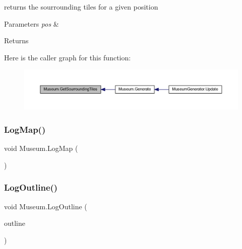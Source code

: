 returns the sourrounding tiles for a given position 


\begin{DoxyParams}{Parameters}
{\em pos} & \\
\hline
\end{DoxyParams}
\begin{DoxyReturn}{Returns}

\end{DoxyReturn}
Here is the caller graph for this function\+:
\nopagebreak
\begin{figure}[H]
\begin{center}
\leavevmode
\includegraphics[width=350pt]{class_museum_af5b732fe3a0821d02852171a73cf8f8b_icgraph}
\end{center}
\end{figure}
\mbox{\label{class_museum_a6a161feedcbb8a471eb0e68b7e3e4027}} 
\subsubsection{\texorpdfstring{Log\+Map()}{LogMap()}}
{\footnotesize\ttfamily void Museum.\+Log\+Map (\begin{DoxyParamCaption}{ }\end{DoxyParamCaption})\hspace{0.3cm}{\ttfamily [private]}}

\mbox{\label{class_museum_a237d1ccf7cb53c4db64647b6addc6576}} 
\subsubsection{\texorpdfstring{Log\+Outline()}{LogOutline()}}
{\footnotesize\ttfamily void Museum.\+Log\+Outline (\begin{DoxyParamCaption}\item[{Hash\+Set$<$ int $>$}]{outline }\end{DoxyParamCaption})\hspace{0.3cm}{\ttfamily [private]}}

